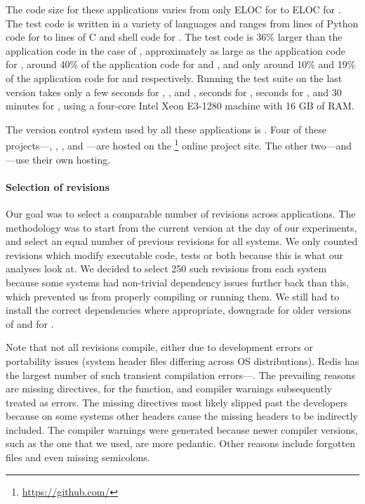 The code size for these applications varies from only \memcachedSize
ELOC for \memcached to \gitSize ELOC for \git.  The test code is written in
a variety of languages and ranges from \lighttpdtwoTsize lines of Python
code for \lighttpdtwo to \gitTsize lines of C and shell code for \git.
The test code is 36\% larger than the application code in the case
of \git, approximately as large as the application code for
\memcached, around 40\% of the application code for \redis and \zeromq,
and only around 10\% and 19\% of the application code for \lighttpdtwo and
\binutils respectively.  Running the test suite on the last version 
takes only a few seconds for \binutils, \lighttpdtwo, and \zeromq,
\memcachedTestTime seconds for \memcached, \redisTestTime seconds for 
\redis, and 30 minutes for \git, using a four-core Intel Xeon 
E3-1280 machine with 16 GB of RAM.

The version control system used by all these applications is \git.  Four
of these projects---\git, \memcached, \redis, and \zeromq ---are hosted
on the \github\footnote{\url{https://github.com/}} online project site.
The other two---\binutils and \lighttpdtwo---use their own \git hosting.


\paragraph{Selection of revisions} Our goal was to select a comparable number
of revisions across applications. The methodology was to start from the current
version at the day of our experiments, and select an equal number of previous
revisions for all systems. We only counted revisions which modify executable
code, tests or both because this is what our analyses look at. We decided to
select 250 such revisions from each system because some systems had non-trivial
dependency issues further back than this, which prevented us from properly
compiling or running them.  We still had to install the correct dependencies
where appropriate, \eg downgrade  for older versions of \lighttpdtwo
and  for \memcached.

Note that not all revisions compile, either due to development errors
or portability issues (\eg system header files differing across OS
distributions).
Redis has the largest number of such transient compilation
errors---\redisTransientCompErrs.  The prevailing reasons are
missing  directives, \eg {} for
the  function, and compiler warnings subsequently treated as errors.
The missing  directives most likely slipped past the
developers because on some systems other  headers cause the
missing headers to be indirectly included. The compiler warnings were
generated because newer compiler versions, such as the one that we used,
are more pedantic.
Other reasons include forgotten files and even missing semicolons.

